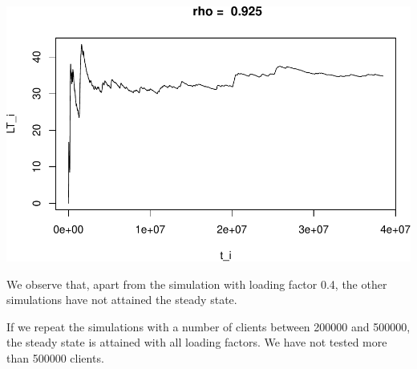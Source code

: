 \documentclass[]{article}
\begin{document}
\includegraphics{003_files/figure-latex/unnamed-chunk-11-4.pdf}

We observe that, apart from the simulation with loading factor 0.4, the
other simulations have not attained the steady state.

If we repeat the simulations with a number of clients between 200000 and
500000, the steady state is attained with all loading factors. We have
not tested more than 500000 clients.
\end{document}
